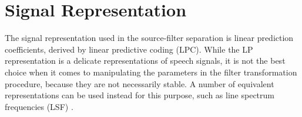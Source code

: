 % 
% 
% 
% 

\section{Signal Representation} %
\label{sec:signal_representation}
The signal representation used in the source-filter separation is linear prediction coefficients, derived by linear predictive coding (LPC). While the LP representation is a delicate representations of speech signals, it is not the best choice when it comes to manipulating the parameters in the filter transformation procedure, because they are not necessarily stable. A number of equivalent representations can be used instead for this purpose, such as line spectrum frequencies (LSF) \cite{taletek}.


